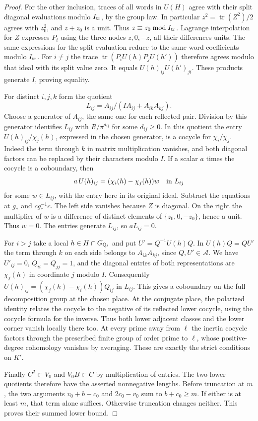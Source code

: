 \documentclass[a4paper,11pt]{article}
\theoremstyle{definition}
\theoremstyle{remark}
\numberwithin{equation}{section}
\begin{document}
\begin{proof}
For the other inclusion, traces of all words in \(U(H)\) agree with
their split diagonal evaluations modulo \(I_{\rm tr}\), by the group
law. In particular \(z^2=\operatorname{tr}(Z^2)/2\) agrees with
\(z_0^2\), and \(z+z_0\) is a unit. Thus \(z\equiv z_0\bmod I_{\rm tr}\).
Lagrange interpolation for \(Z\) expresses \(P_i\) using the three
nodes \(z,0,-z\), all their differences units. The same expressions
for the split evaluation reduce to the same word coefficients modulo
\(I_{\rm tr}\). For \(i\ne j\) the trace
\(\operatorname{tr}(P_iU(h)P_jU(h'))\) therefore agrees modulo that
ideal with its split value zero. It equals \(U(h)_{ij}U(h')_{ji}\).
These products generate \(I\), proving equality.

For distinct \(i,j,k\) form the quotient
\[
  L_{ij}=A_{ij}/(I A_{ij}+A_{ik}A_{kj}).
\]
Choose a generator of \(A_{ij}\), the same one for each reflected
pair. Division by this generator identifies \(L_{ij}\) with
\(R/\pi^{d_{ij}}\) for some \(d_{ij}\ge0\). In this quotient the
entry \(U(h)_{ij}/\chi_j(h)\), expressed in the chosen generator, is
a cocycle for \(\chi_i/\chi_j\). Indeed the term through \(k\) in
matrix multiplication vanishes, and both diagonal factors can be
replaced by their characters modulo \(I\). If a scalar \(a\) times
the cocycle is a coboundary, then
\[
 a\,U(h)_{ij}=(\chi_i(h)-\chi_j(h))w\quad\hbox{in }L_{ij}
\]
for some \(w\in L_{ij}\), with the entry here in its original ideal.
Subtract the equations at \(g_*\) and \(cg_*^{-1}c\). The left side
vanishes because \(Z\) is diagonal. On the right the multiplier of
\(w\) is a difference of distinct elements of \(\{z_0,0,-z_0\}\),
hence a unit. Thus \(w=0\). The entries generate \(L_{ij}\), so
\(aL_{ij}=0\).

For \(i>j\) take a local \(h\in H\cap G_{\mathbb Q_\ell}\) and put
\(U'=Q^{-1}U(h)Q\). In \(U(h)Q=QU'\) the term through \(k\) on
each side belongs to \(A_{ik}A_{kj}\), since \(Q,U'\in\mathcal A\).
We have \(U'_{ij}=0\), \(Q_{ii}=Q_{jj}=1\), and the diagonal entries
of both representations are \(\chi_j(h)\) in coordinate \(j\)
modulo \(I\). Consequently
\(U(h)_{ij}=(\chi_j(h)-\chi_i(h))Q_{ij}\) in \(L_{ij}\).
This gives a coboundary on the full decomposition group at the chosen
place. At the conjugate place, the polarized identity relates the
cocycle to the negative of its reflected lower cocycle, using the
cocycle formula for the inverse. Thus both lower adjacent classes
and the lower corner vanish locally there too. At every prime away
from \(\ell\) the inertia cocycle factors through the prescribed
finite group of order prime to \(\ell\), whose positive-degree
cohomology vanishes by averaging. These are exactly the strict
conditions on \(K'\).

Finally \(C^2\subset V_0\) and \(V_0 B\subset C\) by multiplication
of entries. The two lower quotients therefore have the asserted
nonnegative lengths. Before truncation at \(m\), the two arguments
\(v_0+b-c_0\) and \(2c_0-v_0\) sum to \(b+c_0\ge m\). If either is
at least \(m\), that term alone suffices. Otherwise truncation changes
neither. This proves their summed lower bound.
\end{proof}
\end{document}

